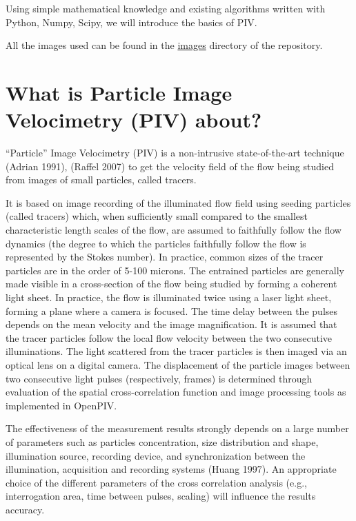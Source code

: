 \documentclass[
  english,
  letterpaper,
  numbers=noendperiod,
  DIV=13]{scrreprt}
\begin{document}
Using simple mathematical knowledge and existing algorithms written with
Python, Numpy, Scipy, we will introduce the basics of PIV.

All the images used can be found in the
\href{https://github.com/jfkrawczynski/um5mee12_jfk/tree/main/images}{images}
directory of the repository.

\section{What is Particle Image Velocimetry (PIV)
about?}\label{what-is-particle-image-velocimetry-piv-about}

``Particle'' Image Velocimetry (PIV) is a non-intrusive state-of-the-art
technique (Adrian 1991), (Raffel 2007) to get the velocity field of the
flow being studied from images of small particles, called tracers.

It is based on image recording of the illuminated flow field using
seeding particles (called tracers) which, when sufficiently small
compared to the smallest characteristic length scales of the flow, are
assumed to faithfully follow the flow dynamics (the degree to which the
particles faithfully follow the flow is represented by the Stokes
number). In practice, common sizes of the tracer particles are in the
order of 5-100 microns. The entrained particles are generally made
visible in a cross-section of the flow being studied by forming a
coherent light sheet. In practice, the flow is illuminated twice using a
laser light sheet, forming a plane where a camera is focused. The time
delay between the pulses depends on the mean velocity and the image
magnification. It is assumed that the tracer particles follow the local
flow velocity between the two consecutive illuminations. The light
scattered from the tracer particles is then imaged via an optical lens
on a digital camera. The displacement of the particle images between two
consecutive light pulses (respectively, frames) is determined through
evaluation of the spatial cross-correlation function and image
processing tools as implemented in OpenPIV.

The effectiveness of the measurement results strongly depends on a large
number of parameters such as particles concentration, size distribution
and shape, illumination source, recording device, and synchronization
between the illumination, acquisition and recording systems (Huang
1997). An appropriate choice of the different parameters of the cross
correlation analysis (e.g., interrogation area, time between pulses,
scaling) will influence the results accuracy.
\end{document}
